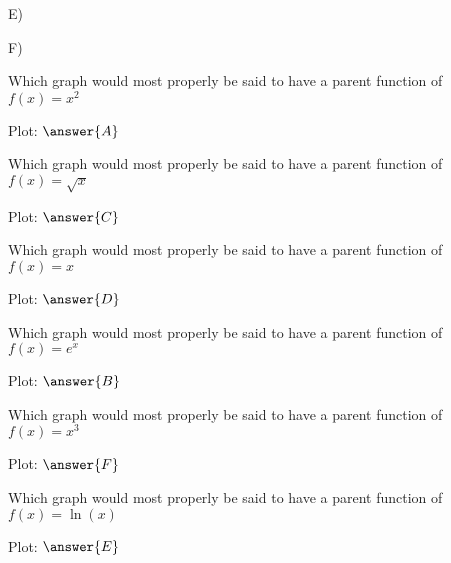 \documentclass{ximera}
\begin{document}
E) 
F) 

\begin{problem}
    Which graph would most properly be said to have a parent function of $f(x) = x^2$

    Plot: $\answer{A}$
\end{problem}
\begin{problem}
    Which graph would most properly be said to have a parent function of $f(x) = \sqrt{x}$

     Plot: $\answer{C}$
\end{problem}
\begin{problem}
    Which graph would most properly be said to have a parent function of $f(x) = x$

    Plot: $\answer{D}$
\end{problem}
\begin{problem}
   Which graph would most properly be said to have a parent function of $f(x) = e^x$

    Plot: $\answer{B}$
\end{problem}
\begin{problem}
    Which graph would most properly be said to have a parent function of $f(x) = x^3$

    Plot: $\answer{F}$
\end{problem}
\begin{problem}
    Which graph would most properly be said to have a parent function of $f(x) = \ln(x)$

    Plot: $\answer{E}$
\end{problem}
\end{document}
